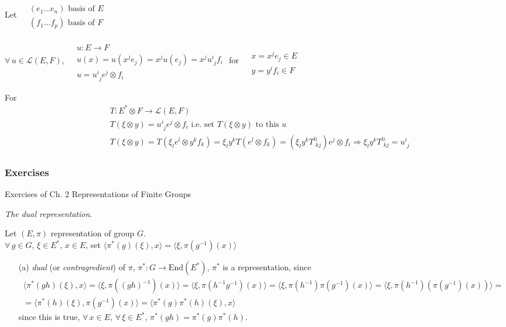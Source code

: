 \documentclass[10pt]{amsart}
\newcommand{\exercisehead}[1]
  { \smallskip
   \noindent{\small\bf Exercise #1.}
  }
\begin{document}
\begin{multicols*}{2}
Let $\begin{aligned} & \quad \\
& (e_1 \dots e_n) \text{ basis of $E$ } \\
& (f_1 \dots f_p) \text{ basis of $F$ } \end{aligned}$ 

$\forall \, u \in \mathcal{L}(E,F)$, $\begin{aligned} & \quad \\
& u : E \to F \\
& u(x) = u(x^j e_j) = x^ju(e_j) = x^ju^i_{ \,\, j}f_i \\
& u = u^i_{ \,\, j} e^j \otimes f_i \end{aligned}$ for $\begin{aligned} & \quad \\ 
& x = x^j e_j \in E \\
& y = y^i f_i \in F \end{aligned}$

For 
\[
\begin{aligned}
& T : E^* \otimes F \to \mathcal{L}(E,F) \\
& T(\xi \otimes y) = u^i_{ \,\,j}e^j \otimes f_i \text{ i.e. set $T(\xi \otimes y)$ to this $u$} \\
& T(\xi \otimes y) = T(\xi_l e^l \otimes y^k f_k) = \xi_l y^k T(e^l \otimes f_k) = (\xi_l y^k T^{li}_{ \,\, kj} ) e^j \otimes f_i \Longrightarrow \xi_l y^k T^{li}_{ \,\, kj} = u^i_{ \,\, j}
\end{aligned}
\]

\subsubsection*{Exercises}

Exercises of Ch. 2 Representations of Finite Groups \cite{YKosmann-Schwarzbach2010}

\exercisehead{2.6}\cite{YKosmann-Schwarzbach2010} \emph{The dual representation}.  

Let $(E,\pi)$ representation of group $G$.  \\
$\forall \, g \in G$, $\xi \in E^*$, $x\in E$, set $\langle \pi^*(g)(\xi), x \rangle = \langle \xi, \pi(g^{-1})(x) \rangle$
\begin{enumerate}
	\item[(a)] \emph{dual} (or \emph{contragredient}) of $\pi$, $\pi^*:G \to \text{End}(E^*)$, $\pi^*$ is a representation, since
	\[
	\begin{gathered}
	\langle \pi^*(gh)(\xi),x\rangle = \langle \xi, \pi((gh)^{-1})(x) \rangle = \langle \xi, \pi(h^{-1}g^{-1})(x) \rangle = \langle \xi, \pi(h^{-1}) \pi(g^{-1})(x) \rangle = \langle \xi, \pi(h^{-1}) (\pi(g^{-1})(x)) \rangle =  \\
	= \langle \pi^*(h)(\xi), \pi(g^{-1})(x) \rangle = \langle \pi^*(g)\pi^*(h)(\xi), x \rangle
	\end{gathered}
	\]
	since this is true, $\forall \, x \in E$, $\forall \, \xi \in E^*$, $\pi^*(gh) = \pi^*(g)\pi^*(h)$.  
	

\end{enumerate}
\end{multicols*}
\end{document}
